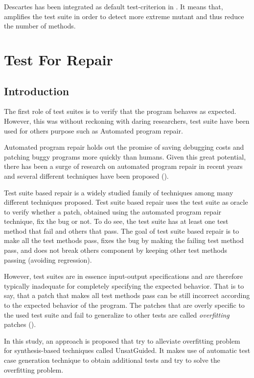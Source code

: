 Descartes has been integrated as default test-criterion in \dspot.
It means that, \dspot amplifies the test suite in order to detect more extreme mutant and thus reduce the number of \pseudotested methods.

\section{Test For Repair}
\label{sec:transversal-contributions:test-for-repair}


\subsection{Introduction}
\label{subsec:transversal-contributions:test-for-repair:introduction}

The first role of test suites is to verify that the program behaves as expected.
However, this was without reckoning with daring researchers, test suite have been used for others purpose such as Automated program repair.

Automated program repair holds out the promise of saving debugging costs and patching buggy programs more quickly than humans. 
Given this great potential, there has been a surge of research on automated program repair in recent years and several different techniques have been proposed (\cite{genprog,semfix,nopol,tsepei,long2017automatic}).

Test suite based repair is a widely studied family of techniques among many different techniques proposed.
Test suite based repair uses the test suite as oracle to verify whether a patch, obtained using the automated program repair technique, fix the bug or not.
To do see, the test suite has at least one test method that fail and others that pass.
The goal of test suite based repair is to make all the test methods pass, \ie fixes the bug by making the failing test method pass, and does not break others component by keeping other test methods passing (avoiding regression).

However, test suites are in essence input-output specifications and are therefore typically inadequate for completely specifying the expected behavior.
That is to say, that a patch that makes all test methods pass can be still incorrect according to the expected behavior of the program.
The patches that are overly specific to the used test suite and fail to generalize to other tests are called \emph{overfitting} patches (\cite{smith2015cure}).

In this study, an approach is proposed that try to alleviate overfitting problem for synthesis-based techniques called UnsatGuided.
It makes use of automatic test case generation technique to obtain additional tests and try to solve the overfitting problem.

